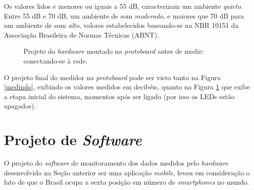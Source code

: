 \documentclass[
    12pt,               %
    openright,          %
    oneside,
    a4paper,            
    english,            %
    brazil              %
    ]{abntex2}
\begin{document}
Os valores lidos e menores ou iguais a 55 dB, caracterizam um ambiente \textit{quieto}. Entre 55 dB e 70 dB, um ambiente de som \textit{moderado}, e maiores que 70 dB para um ambiente de som \textit{alto}, valores estabelecidos baseando-se na NBR 10151 da Associação Brasileira de Normas Técnicas (ABNT).

\begin{figure}[!htb]
    \centering
    \qquad
    \caption{Projeto do \textit{hardware} montado na \textit{protoboard} antes de medir: conectando-se à rede.}%
    \label{setado}
\end{figure}

O projeto final do medidor na \textit{protoboard} pode ser visto tanto na Figura \ref{medindo}, exibindo os valores medidos em decibéis, quanto na Figura \ref{setado} que exibe a etapa inicial do sistema, momentos após ser ligado (por isso os LEDs estão apagados).

\section{Projeto de \textit{Software}}\label{projeto-soft}

O projeto do \textit{software} de monitoramento dos dados medidos pelo \textit{hardware} desenvolvido na Seção anterior ser uma aplicação \textit{mobile}, levou em consideração o fato de que o Brasil ocupa a sexta posição em número de \textit{smartphones} no mundo.
\end{document}
